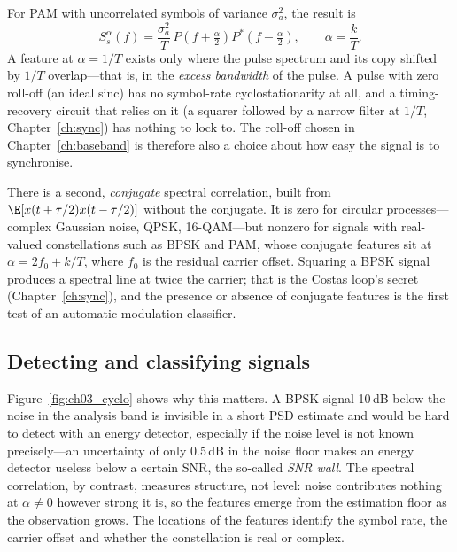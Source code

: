For PAM with uncorrelated symbols of variance $\sigma_a^2$, the result is
\begin{equation}
S_s^{\alpha}(f)=\frac{\sigma_a^2}{T}\,P\!\left(f+\tfrac\alpha2\right)P^*\!\left(f-\tfrac\alpha2\right),
\qquad \alpha=\frac kT .
\label{eq:ch03:pamscf}
\end{equation}
A feature at $\alpha=1/T$ exists only where the pulse spectrum and its copy shifted by $1/T$
overlap---that is, in the \emph{excess bandwidth} of the pulse. A pulse with zero roll-off (an ideal
sinc) has no symbol-rate cyclostationarity at all, and a timing-recovery circuit that relies on it (a
squarer followed by a narrow filter at $1/T$, Chapter~\ref{ch:sync}) has nothing to lock to. The
roll-off chosen in Chapter~\ref{ch:baseband} is therefore also a choice about how easy the signal is to
synchronise.

There is a second, \emph{conjugate} spectral correlation, built from $\E[x(t+\tau/2)x(t-\tau/2)]$
without the conjugate. It is zero for circular processes---complex Gaussian noise, QPSK,
16-QAM---but nonzero for signals with real-valued constellations such as BPSK and PAM, whose conjugate
features sit at $\alpha=2f_0+k/T$, where $f_0$ is the residual carrier offset. Squaring a BPSK signal
produces a spectral line at twice the carrier; that is the Costas loop's secret (Chapter~\ref{ch:sync}),
and the presence or absence of conjugate features is the first test of an automatic modulation
classifier.

\subsection{Detecting and classifying signals}

Figure~\ref{fig:ch03_cyclo} shows why this matters. A BPSK signal 10\,dB below the noise in the
analysis band is invisible in a short PSD estimate and would be hard to detect with an energy detector,
especially if the noise level is not known precisely---an uncertainty of only 0.5\,dB in the noise floor
makes an energy detector useless below a certain SNR, the so-called \emph{SNR wall}. The spectral
correlation, by contrast, measures structure, not level: noise contributes nothing at $\alpha\ne0$
however strong it is, so the features emerge from the estimation floor as the observation grows. The
locations of the features identify the symbol rate, the carrier offset and whether the constellation is
real or complex.

